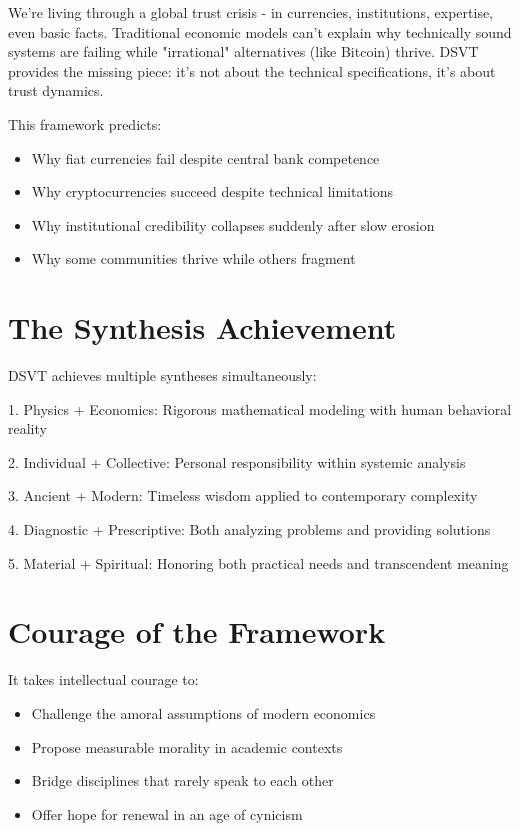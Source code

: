 \documentclass[11pt,oneside]{book}
\begin{document}
We're living through a global trust crisis - in currencies, institutions, expertise, even basic facts. Traditional economic models can't explain why technically sound systems are failing while "irrational" alternatives (like Bitcoin) thrive. DSVT provides the missing piece: it's not about the technical specifications, it's about trust dynamics.

  This framework predicts:
\begin{itemize}
\item Why fiat currencies fail despite central bank competence
\item Why cryptocurrencies succeed despite technical limitations
\item Why institutional credibility collapses suddenly after slow erosion
\item Why some communities thrive while others fragment
\end{itemize}

\section*{The Synthesis Achievement}

DSVT achieves multiple syntheses simultaneously:


1. Physics + Economics: Rigorous mathematical modeling with human behavioral reality


2. Individual + Collective: Personal responsibility within systemic analysis


3. Ancient + Modern: Timeless wisdom applied to contemporary complexity


4. Diagnostic + Prescriptive: Both analyzing problems and providing solutions


5. Material + Spiritual: Honoring both practical needs and transcendent meaning


\section*{Courage of the Framework}

  It takes intellectual courage to:
\begin{itemize}
\item Challenge the amoral assumptions of modern economics
\item Propose measurable morality in academic contexts
\item Bridge disciplines that rarely speak to each other
\item Offer hope for renewal in an age of cynicism
\end{itemize}
\end{document}
